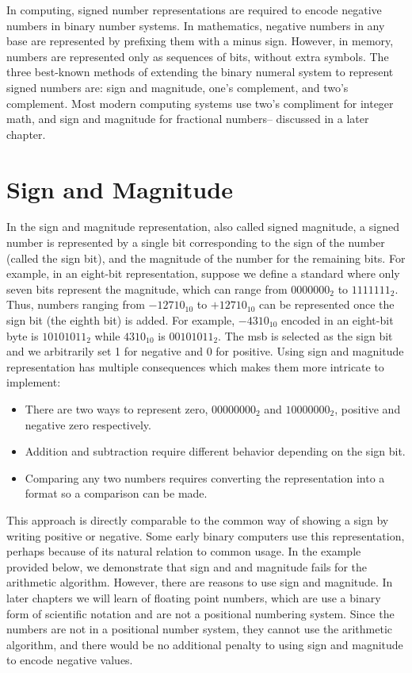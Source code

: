 \documentclass[letterpaper, 12pt]{book}
\begin{document}
In computing, signed number representations are required to encode negative numbers in binary number systems. In 
mathematics, negative numbers in any base are represented by prefixing them with a minus sign. However, in memory, 
numbers are represented only as sequences of bits, without extra symbols. The three best-known methods of extending the 
binary numeral system to represent signed numbers are: sign and magnitude, one's complement, and two's complement. Most 
modern computing systems use two's compliment for integer math, and sign and magnitude for fractional numbers--%
discussed in a later chapter. 

\section{Sign and Magnitude\label{sec:signmag}}

In the \gls{sign and magnitude} representation, also called signed magnitude, a signed number is represented by a single bit 
corresponding to the sign of the number (called the sign bit), and the \gls{magnitude} of the number for the remaining %
bits. For example, in an eight-bit representation, suppose we define a standard where only seven bits represent the magnitude, 
which can range from $0000000_2$ to $1111111_2$. Thus, numbers ranging from $-12710_{10}$ to $+12710_{10}$ can be represented 
once the sign bit (the eighth bit) is added. For example, $-4310_{10}$ encoded in an eight-bit byte is $10101011_2$ while 
$4310_{10}$ is $00101011_2$. The \gls{msb} is selected as the sign bit and we arbitrarily set 1 for negative and 0 for 
positive. Using sign and magnitude representation has multiple consequences which makes them more intricate to implement:

\begin{itemize}
    \item There are two ways to represent zero, $00000000_2$ and $10000000_2$, positive and negative zero respectively.
    \item Addition and subtraction require different behavior depending on the sign bit.
    \item Comparing any two numbers requires converting the representation into a format so a comparison can be made.
\end{itemize}

This approach is directly comparable to the common way of showing a sign by writing positive or negative. Some early 
binary computers use this representation, perhaps because of its natural relation to common usage. In the example 
provided below, we demonstrate that sign and and magnitude fails for the arithmetic algorithm.%
%
However, there are reasons to use sign and magnitude. In later chapters we will learn of \glspl{floating point number}, which 
are use a binary form of scientific notation %
 and are not a positional numbering system. Since the numbers are not in a positional number system, they cannot 
 use the arithmetic algorithm, and there would be no additional penalty to using sign and magnitude to encode 
negative values. 
\end{document}
